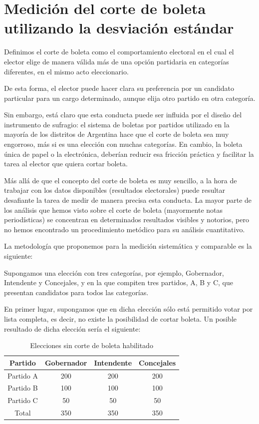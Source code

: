 \documentclass[12pt,a4paper]{article}
\begin{document}
\section{Medición del corte de boleta utilizando la desviación estándar}
Definimos el corte de boleta como el comportamiento electoral en el cual el
elector elige de manera válida más de una opción partidaria en categorías diferentes, en el mismo
acto eleccionario.

De esta forma, el elector puede hacer clara su preferencia por un candidato
particular para un cargo determinado, aunque elija otro partido en otra
categoría.

Sin embargo, está claro que esta conducta puede ser influida por el diseño del
instrumento de sufragio: el sistema de boletas por partidos utilizado en la
mayoría de los distritos de Argentina hace que el corte de boleta sea muy
engorroso, más si es una elección con muchas categorías. En cambio, la boleta
única de papel o la electrónica, deberían reducir esa fricción práctica y
facilitar la tarea al elector que quiera cortar boleta.

Más allá de que el concepto del corte de boleta es muy sencillo, a la hora de
trabajar con los datos disponibles (resultados electorales) puede resultar
desafiante la tarea de medir de manera precisa esta conducta. La mayor parte de
los análisis que hemos visto sobre el corte de boleta (mayormente notas
periodísticas) se concentran en determinados resultados visibles y notorios,
pero no hemos encontrado un procedimiento metódico para su análisis cuantitativo.

La metodología que proponemos para la medición sistemática y comparable es la
siguiente:

Supongamos una elección con tres categorías, por ejemplo, Gobernador, Intendente
y Concejales, y en la que compiten tres partidos, A, B y C, que presentan
candidatos para todos las categorías.

En primer lugar, supongamos que en dicha elección sólo está permitido votar por
lista completa, es decir, no existe la posibilidad de cortar boleta. Un posible
resultado de dicha elección sería el siguiente:

\renewcommand{\arraystretch}{1.25}
\begin{table}[h!]
\centering
\begin{tabular}{c c c c} 
 Partido & Gobernador & Intendente & Concejales \\ [0.5ex] 
 \hline
Partido A & 200 & 200 & 200 \\
Partido B & 100 & 100 & 100 \\
Partido C & 50 & 50 & 50 \\
 \hline
Total & 350 & 350 & 350 \\ [1ex]
 \hline
\end{tabular}
\caption{Elecciones sin corte de boleta habilitado}
\label{table:1}
\end{table}
\end{document}
